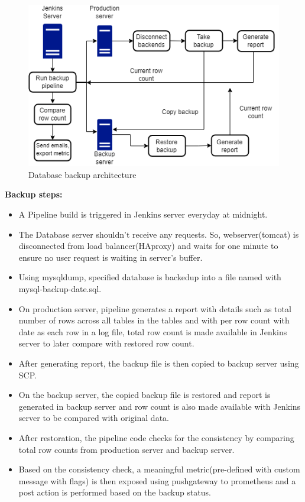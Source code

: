 \documentclass[12pt,a4paper,oneside]{report}
\begin{document}
\begin{figure}[ht]
	\centering
	\includegraphics{images/backup.png}
	\caption{Database backup architecture}
	\label{fig:figure4_2}
\end{figure}

\hspace{1cm}\textbf{{\large Backup steps:}}
\begin{itemize}
	\item A Pipeline build is triggered in Jenkins server everyday at midnight. 
	\item  The Database server shouldn't receive any requests. So, webserver(tomcat) is disconnected from load balancer(HAproxy) and waits for one minute to ensure no user request is waiting in server's buffer.
	\item Using mysqldump, specified database is backedup into a file named with mysql-backup-date.sql. 
	\item On production server, pipeline generates a report with details such as total number of rows across all tables in the tables and with per row count with date as each row in a log file, total row count is made available in Jenkins server to later compare with restored row count.
	\item After generating report, the backup file is then copied to backup server using SCP.
	\item On the backup server, the copied backup file is restored and report is generated in backup server and row count is also made available with Jenkins server to be compared with original data.
	\item After restoration, the pipeline code checks for the consistency by comparing total row counts from production server and backup server.
	\item Based on the consistency check, a meaningful metric(pre-defined with custom message with flags) is then exposed using pushgateway to prometheus and a post action is performed based on the backup status.
\end{itemize}
\end{document}
